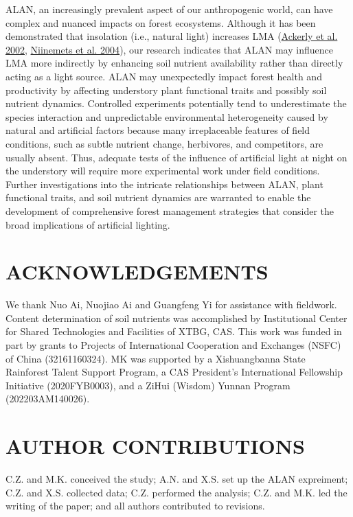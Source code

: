 \documentclass[
  12pt,
  letterpaper,
  DIV=11,
  numbers=noendperiod]{scrartcl}
\begin{document}
ALAN, an increasingly prevalent aspect of our anthropogenic world, can
have complex and nuanced impacts on forest ecosystems. Although it has
been demonstrated that insolation (i.e., natural light) increases LMA
(\protect\hyperlink{ref-Ackerly2002}{Ackerly et al. 2002},
\protect\hyperlink{ref-Niinemets2004}{Niinemets et al. 2004}), our
research indicates that ALAN may influence LMA more indirectly by
enhancing soil nutrient availability rather than directly acting as a
light source. ALAN may unexpectedly impact forest health and
productivity by affecting understory plant functional traits and
possibly soil nutrient dynamics. Controlled experiments potentially tend
to underestimate the species interaction and unpredictable environmental
heterogeneity caused by natural and artificial factors because many
irreplaceable features of field conditions, such as subtle nutrient
change, herbivores, and competitors, are usually absent. Thus, adequate
tests of the influence of artificial light at night on the understory
will require more experimental work under field conditions. Further
investigations into the intricate relationships between ALAN, plant
functional traits, and soil nutrient dynamics are warranted to enable
the development of comprehensive forest management strategies that
consider the broad implications of artificial lighting.

\hypertarget{acknowledgements}{%
\section{ACKNOWLEDGEMENTS}\label{acknowledgements}}

We thank Nuo Ai, Nuojiao Ai and Guangfeng Yi for assistance with
fieldwork. Content determination of soil nutrients was accomplished by
Institutional Center for Shared Technologies and Facilities of XTBG,
CAS. This work was funded in part by grants to Projects of International
Cooperation and Exchanges (NSFC) of China (32161160324). MK was
supported by a Xishuangbanna State Rainforest Talent Support Program, a
CAS President's International Fellowship Initiative (2020FYB0003), and a
ZiHui (Wisdom) Yunnan Program (202203AM140026).

\hypertarget{author-contributions}{%
\section{AUTHOR CONTRIBUTIONS}\label{author-contributions}}

C.Z. and M.K. conceived the study; A.N. and X.S. set up the ALAN
expreiment; C.Z. and X.S. collected data; C.Z. performed the analysis;
C.Z. and M.K. led the writing of the paper; and all authors contributed
to revisions.
\end{document}
